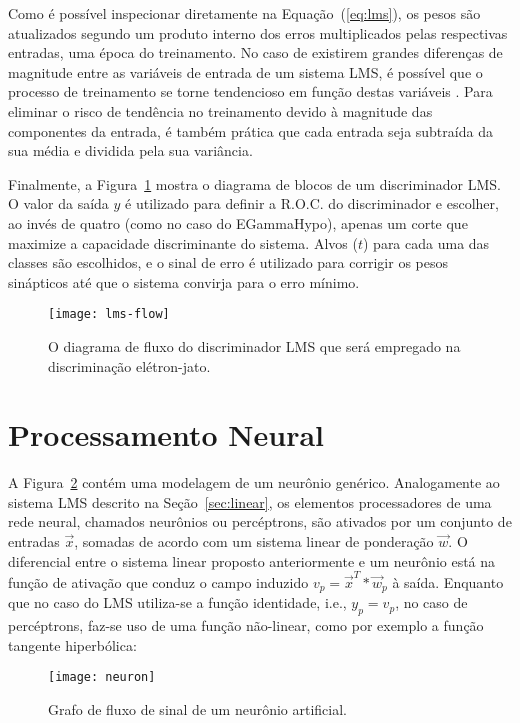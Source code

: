 Como é possível inspecionar diretamente na Equação~(\ref{eq:lms}), os pesos
são atualizados segundo um produto interno dos erros multiplicados pelas
respectivas entradas, uma época do treinamento. No caso de existirem grandes
diferenças de magnitude entre as variáveis de entrada de um sistema LMS, é
possível que o processo de treinamento se torne tendencioso em função destas
variáveis \cite{haykin-adaptative}. Para eliminar o risco de tendência no
treinamento devido à magnitude das componentes da entrada, é também prática
que cada entrada seja subtraída da sua média e dividida pela sua variância.

Finalmente, a Figura~\ref{fig:lms-flow} mostra o diagrama de blocos de um
discriminador LMS. O valor da saída $y$ é utilizado para definir a R.O.C. do
discriminador e escolher, ao invés de quatro (como no caso do EGammaHypo),
apenas um corte que maximize a capacidade discriminante do sistema. Alvos
($t$) para cada uma das classes são escolhidos, e o sinal de erro é utilizado
para corrigir os pesos sinápticos até que o sistema convirja para o erro
mínimo.

\begin{figure}
\begin{center}
\texttt{[image: lms-flow]}
\end{center}
\caption{O diagrama de fluxo do discriminador LMS que será empregado na
discriminação elétron-jato.}
\label{fig:lms-flow}
\end{figure}

\section{Processamento Neural}

A Figura~\ref{fig:neuron} contém uma modelagem de um neurônio
genérico. Analogamente ao sistema LMS descrito na Seção~\ref{sec:linear}, os
elementos processadores de uma rede neural, chamados neurônios ou percéptrons,
são ativados por um conjunto de entradas $\overrightarrow{x}$, somadas de
acordo com um sistema linear de ponderação $\overrightarrow{w}$. O diferencial
entre o sistema linear proposto anteriormente e um neurônio está na função de
ativação que conduz o campo induzido $v_p =
\overrightarrow{x}^{T}*\overrightarrow{w}_{p}$ à saída. Enquanto que
no caso do LMS utiliza-se a função identidade, i.e., $y_p = v_p$, no caso de
percéptrons, faz-se uso de uma função não-linear, como por exemplo a função
tangente hiperbólica:

\begin{figure}
\begin{center}
\texttt{[image: neuron]}
\end{center}
\caption{Grafo de fluxo de sinal de um neurônio artificial.}
\label{fig:neuron}
\end{figure}

